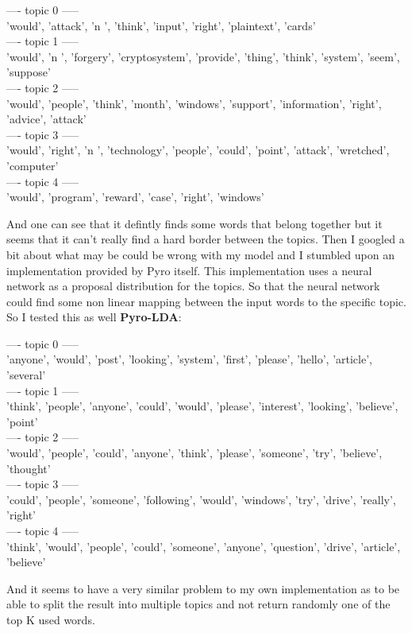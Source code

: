 \documentclass[10pt,conference,compsocconf]{IEEEtran}
\begin{document}
\begin{framed}
	---- topic 0 ----- \\ 
	'would', 'attack', 'n        ', 'think', 'input', 'right', 'plaintext', 'cards'\\
	---- topic 1 -----\\
	'would', 'n    ', 'forgery', 'cryptosystem', 'provide', 'thing', 'think', 'system', 'seem', 'suppose'\\
	---- topic 2 -----\\
	'would', 'people', 'think', 'month', 'windows', 'support', 'information', 'right', 'advice', 'attack'\\
	---- topic 3 -----\\
	'would', 'right', 'n        ', 'technology', 'people', 'could', 'point', 'attack', 'wretched', 'computer'\\
	---- topic 4 -----\\
	'would', 'program', 'reward', 'case', 'right', 'windows'
\end{framed}
 And one can see that it defintly finds some words that belong together but it seems that it can't really find a hard border between the topics. Then I googled a bit about what may be could be wrong with my model and I stumbled upon an implementation provided by Pyro itself. This implementation uses a neural network as a proposal distribution for the topics. So that the neural network could find some non linear mapping between the input words to the specific topic. So I tested this as well \textbf{Pyro-LDA}:
 \begin{framed}
 	---- topic 0 -----\\
 	'anyone', 'would', 'post', 'looking', 'system', 'first', 'please', 'hello', 'article', 'several'\\
 	---- topic 1 -----\\
 	'think', 'people', 'anyone', 'could', 'would', 'please', 'interest', 'looking', 'believe', 'point'\\
 	---- topic 2 -----\\
 	'would', 'people', 'could', 'anyone', 'think', 'please', 'someone', 'try', 'believe', 'thought'\\
 	---- topic 3 -----\\
 	'could', 'people', 'someone', 'following', 'would', 'windows', 'try', 'drive', 'really', 'right'\\
 	---- topic 4 -----\\
 	'think', 'would', 'people', 'could', 'someone', 'anyone', 'question', 'drive', 'article', 'believe'
 	\end{framed} 
And it seems to have a very similar problem to my own implementation as to be able to split the result into multiple topics and not return randomly one of the top K used words.
\end{document}
